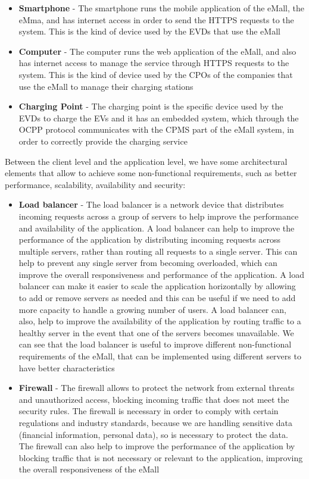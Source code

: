 \begin{itemize}
    \item \textbf{Smartphone} - The smartphone runs the mobile application of the eMall, the eMma, and has internet access in order to send the HTTPS requests to the system. This is the kind of device used by the EVDs that use the eMall
    \item \textbf{Computer} - The computer runs the web application of the eMall, and also has internet access to manage the service through HTTPS requests to the system. This is the kind of device used by the CPOs of the companies that use the eMall to manage their charging stations
    \item \textbf{Charging Point} - The charging point is the specific device used by the EVDs to charge the EVs and it has an embedded system, which through the OCPP protocol communicates with the CPMS part of the eMall system, in order to correctly provide the charging service
\end{itemize}

Between the client level and the application level, we have some architectural elements that allow to achieve some non-functional requirements, such as better performance, scalability, availability and security:
\begin{itemize}
    \item \textbf{Load balancer} - The load balancer is a network device that distributes incoming requests across a group of servers to help improve the performance and availability of the application. A load balancer can help to improve the performance of the application by distributing incoming requests across multiple servers, rather than routing all requests to a single server. This can help to prevent any single server from becoming overloaded, which can improve the overall responsiveness and performance of the application. A load balancer can make it easier to scale the application horizontally by allowing to add or remove servers as needed and this can be useful if we need to add more capacity to handle a growing number of users. A load balancer can, also, help to improve the availability of the application by routing traffic to a healthy server in the event that one of the servers becomes unavailable. We can see that the load balancer is useful to improve different non-functional requirements of the eMall, that can be implemented using different servers to have better characteristics 
    \item \textbf{Firewall} - The firewall allows to protect the network from external threats and unauthorized access, blocking incoming traffic that does not meet the security rules. The firewall is necessary in order to comply with certain regulations and industry standards, because we are handling sensitive data (financial information, personal data), so is necessary to protect the data. The firewall can also help to improve the performance of the application by blocking traffic that is not necessary or relevant to the application, improving the overall responsiveness of the eMall
\end{itemize}

